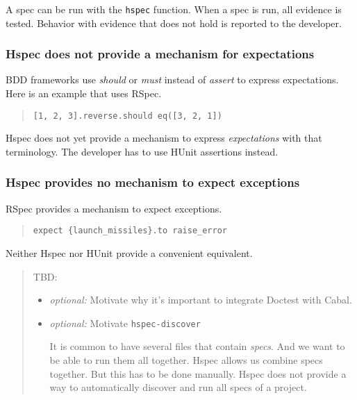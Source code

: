 \documentclass[preprint]{sigplanconf}
\begin{document}
A spec can be run with the \texttt{hspec} function.  When a spec is
run, all evidence is tested.  Behavior with evidence that does not
hold is reported to the developer.

\subsubsection{Hspec does not provide a mechanism for expectations}
BDD frameworks use \emph{should} or \emph{must} instead of
\emph{assert} to express expectations.  Here is an example that uses
RSpec.

\begin{quote}\small\begin{verbatim}
[1, 2, 3].reverse.should eq([3, 2, 1])
\end{verbatim}\end{quote}


\noindent Hspec does not yet provide a mechanism to express
\emph{expectations} with that terminology.  The developer has to use
HUnit assertions instead.

\subsubsection{Hspec provides no mechanism to expect exceptions}
RSpec provides a mechanism to expect exceptions.

\begin{quote}\small\begin{verbatim}
expect {launch_missiles}.to raise_error
\end{verbatim}\end{quote}

\noindent Neither Hspec nor HUnit provide a convenient equivalent.


\begin{quote}
    TBD:
\begin{itemize}
    \item \emph{optional:} Motivate why it's important to integrate
        Doctest with
        Cabal.

    \item \emph{optional:} Motivate \verb|hspec-discover|

        It is common to have several files that contain \emph{specs}.
        And we want to be able to run them all together.  Hspec allows
        us combine specs together.  But this has to be done manually.
        Hspec does not provide a way to automatically discover and run
        all specs of a project.
\end{itemize}
\end{quote}
\end{document}
